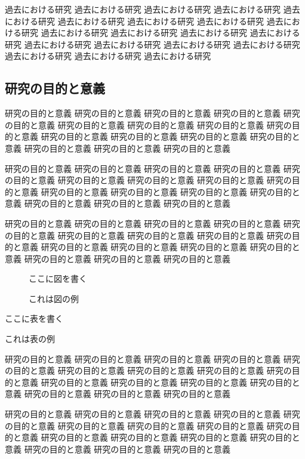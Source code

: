 \documentclass[12pt]{jarticle} %
\begin{document}
過去における研究 過去における研究 過去における研究 過去における研究 
過去における研究 過去における研究 過去における研究 過去における研究 
過去における研究 過去における研究 過去における研究 過去における研究 
過去における研究 過去における研究 過去における研究 過去における研究 
過去における研究 過去における研究 過去における研究 過去における研究 

\subsection{研究の目的と意義}

研究の目的と意義 研究の目的と意義 研究の目的と意義 研究の目的と意義 
研究の目的と意義 研究の目的と意義 研究の目的と意義 研究の目的と意義 
研究の目的と意義 研究の目的と意義 研究の目的と意義 研究の目的と意義 
研究の目的と意義 研究の目的と意義 研究の目的と意義 研究の目的と意義 

研究の目的と意義 研究の目的と意義 研究の目的と意義 研究の目的と意義 
研究の目的と意義 研究の目的と意義 研究の目的と意義 研究の目的と意義 
研究の目的と意義 研究の目的と意義 研究の目的と意義 研究の目的と意義 
研究の目的と意義 研究の目的と意義 研究の目的と意義 研究の目的と意義 

研究の目的と意義 研究の目的と意義 研究の目的と意義 研究の目的と意義 
研究の目的と意義 研究の目的と意義 研究の目的と意義 研究の目的と意義 
研究の目的と意義 研究の目的と意義 研究の目的と意義 研究の目的と意義 
研究の目的と意義 研究の目的と意義 研究の目的と意義 研究の目的と意義 

\begin{figure}
\centerline{ここに図を書く}
\caption{これは図の例}
\end{figure}

\begin{table}
\centerline{ここに表を書く}
\caption{これは表の例}
\end{table}

研究の目的と意義 研究の目的と意義 研究の目的と意義 研究の目的と意義 
研究の目的と意義 研究の目的と意義 研究の目的と意義 研究の目的と意義 
研究の目的と意義 研究の目的と意義 研究の目的と意義 研究の目的と意義 
研究の目的と意義 研究の目的と意義 研究の目的と意義 研究の目的と意義 

研究の目的と意義 研究の目的と意義 研究の目的と意義 研究の目的と意義 
研究の目的と意義 研究の目的と意義 研究の目的と意義 研究の目的と意義 
研究の目的と意義 研究の目的と意義 研究の目的と意義 研究の目的と意義 
研究の目的と意義 研究の目的と意義 研究の目的と意義 研究の目的と意義 
\end{document}
